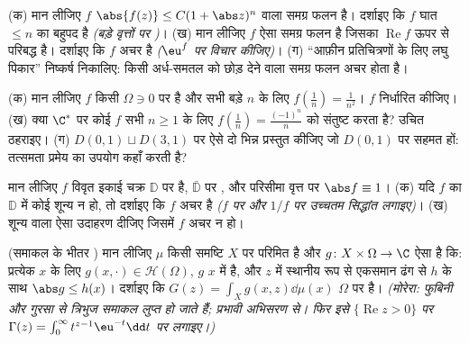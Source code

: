 \begin{exercise}[$\star\star$]\label{exo:b3:holomorphic:4}
(क) मान लीजिए $f$ $\abs{f(z)} \leq C(1 + \abs
z)^{n}$ वाला समग्र फलन है। दर्शाइए कि $f$
घात $\leq n$ का बहुपद है \emph{(बड़े वृत्तों पर )}।
(ख) मान लीजिए $f$ ऐसा समग्र फलन है जिसका $\operatorname{Re}f$ ऊपर से परिबद्ध
है। दर्शाइए कि $f$ अचर है \emph{($\eu^{f}$ पर विचार कीजिए)}।
(ग) ``आफ़ीन प्रतिचित्रणों के लिए लघु पिकार'' निष्कर्ष निकालिए:
किसी अर्ध-समतल को छोड़ देने वाला समग्र फलन अचर होता है।
\end{exercise}

\begin{exercise}[$\star\star$]\label{exo:b3:holomorphic:5}
(क) मान लीजिए $f$ किसी  $\Omega \ni 0$ पर  है और सभी
बड़े $n$ के लिए $f(\frac1n) = \frac1{n^2}$। $f$ निर्धारित कीजिए।
(ख) क्या $\C^*$ पर कोई  $f$ सभी $n \geq 1$ के लिए $f(\frac1n) =
\frac{(-1)^n}{n}$
को संतुष्ट करता है? उचित ठहराइए।
(ग) $D(0,1)\sqcup D(3,1)$ पर ऐसे दो भिन्न  प्रस्तुत कीजिए जो
$D(0,1)$ पर सहमत हों: तत्समता प्रमेय  का उपयोग कहाँ करती है?
\end{exercise}

\begin{exercise}[$\star\star$]\label{exo:b3:holomorphic:6}
मान लीजिए $f$ विवृत इकाई चक्र $\mathbb D$ पर  है, $\bar{\mathbb D}$ पर
, और परिसीमा वृत्त पर $\abs f \equiv 1$।
(क) यदि $f$ का $\mathbb D$ में कोई शून्य न हो, तो दर्शाइए कि $f$
अचर है \emph{($f$ पर और $1/f$ पर उच्चतम सिद्धांत लगाइए)}।
(ख) शून्य वाला ऐसा उदाहरण दीजिए जिसमें $f$ अचर न हो।
\end{exercise}

\begin{exercise}[$\star\star$]\label{exo:b3:holomorphic:7}
(समाकल के भीतर ) मान लीजिए $\mu$ किसी समष्टि $X$
पर परिमित  है और $g \colon X\times\Omega \to \C$ ऐसा है कि: प्रत्येक $x$ के लिए $g(x, \cdot) \in \mathcal H(\Omega)$,
$g$ $x$ में  है, और $z$ में स्थानीय रूप से एकसमान ढंग
से  $h$ के साथ $\abs g \leq h(x)$। दर्शाइए कि $G(z) = \int_Xg(x, z)\dd\mu(x)$ $\Omega$ पर
 है। \emph{(मोरेरा: फुबिनी और गुरसा से त्रिभुज समाकल
लुप्त हो जाते हैं;  प्रभावी अभिसरण से। फिर इसे $\{\operatorname{Re}z >
0\}$ पर
$\Gamma(z) =
\int_0^\infty t^{z-1}\eu^{-t}\dd t$ पर लगाइए।)}
\end{exercise}


